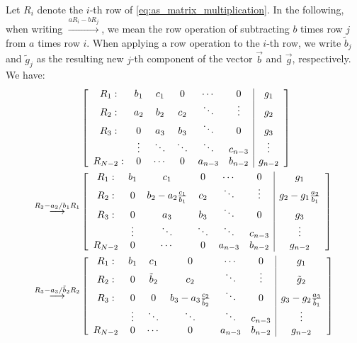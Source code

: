 \documentclass[english,notitlepage,reprint,nofootinbib]{revtex4-2}  %
\begin{document}
Let $R_{i}$ denote the $i$-th row of \eqref{eq:as_matrix_multiplication}. In the following, when writing $\overset{aR_i-b R_j}{\rightarrow}$, we mean the row operation of subtracting $b$ times row \(j\) from \(a\) times row \(i\). When applying a row operation to the $i$-th row, we write \(\tilde{b}_{j}\) and \(\tilde{g}_j\) as the resulting new \(j\)-th component of the vector \(\vec{b}\) and \(\vec{g}\), respectively. We have:
\begin{align}
    &\left[\begin{array}{cccccc|c}
        R_1: & b_1 & c_1 & 0 & \cdots & 0  & g_1\\
        R_2: & a_{2} & b_2 & c_2 & \ddots & \vdots  & g_2\\
        R_3: & 0 & a_{3} & b_3 & \ddots & 0  & g_3\\
        \ & \vdots & \ddots & \ddots & \ddots & c_{n-3}  & \vdots\\
        R_{N-2}: & 0 & \cdots & 0 & a_{n-3} & b_{n-2} & g_{n-2}
    \end{array}\right]
    \notag \\
    \overset{R_2 - a_2/b_1R_1}{\longrightarrow} 
    &\left[\begin{array}{cccccc|c}
        R_1: & b_1 & c_1 & 0 & \cdots & 0  & g_1\\
        R_2: & 0 & b_2-a_2\frac{c_1}{b_1} & c_2 & \ddots & \vdots  & g_2-g_1\frac{a_2}{b_1}\\
        R_3: & 0 & a_{3} & b_3 & \ddots & 0  & g_3\\
        \ & \vdots & \ddots & \ddots & \ddots & c_{n-3}  & \vdots\\
        R_{N-2} & 0 & \cdots & 0 & a_{n-3} & b_{n-2} & g_{n-2}
    \end{array}\right]
    \notag \\
    \overset{R_3 - a_3/\tilde{b}_2R_2}{\longrightarrow} 
    &\left[\begin{array}{cccccc|c}
        R_1: & b_1 & c_1 & 0 & \cdots & 0  & g_1\\
        R_2: & 0 & \tilde{b}_2 & c_2 & \ddots & \vdots  & \tilde{g}_2\\
        R_3: & 0 & 0 & b_3 - a_{3}\frac{c_2}{\tilde{b}_2} & \ddots & 0  & g_3 - g_2\frac{a_3}{\tilde{b}_1}\\
        \ & \vdots & \ddots & \ddots & \ddots & c_{n-3}  & \vdots\\
        R_{N-2} & 0 & \cdots & 0 & a_{n-3} & b_{n-2} & g_{n-2}
    \end{array}\right]
\end{align}
\end{document}

